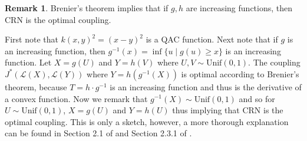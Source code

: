 \documentclass[12pt]{article}
\theoremstyle{plain}%
\theoremstyle{definition}
\newtheorem{remark}{Remark}[section]
\def\unif{\mathrm{Unif}}
\begin{document}
\begin{remark}\label{rem:brenier}
Brenier's theorem implies that if $g,h$ are increasing functions, then CRN is the optimal coupling. 

First note that $k(x,y)^2=(x-y)^2$ is a QAC function. Next note that if $g$ is an increasing function, then $g^{-1}(x)=\inf\{u\mid g(u)\geq x\}$ is an increasing function. Let $X=g(U)$ and $Y=h(V)$ where $U,V\sim \unif(0,1)$. The coupling $J^*(\mathcal{L}(X),\mathcal{L}(Y))$ where $Y=h(g^{-1}(X))$ is optimal according to Brenier's theorem, because $T=h\cdot g^{-1}$ is an increasing function and thus is the derivative of a convex function. Now we remark that $g^{-1}(X)\sim\unif(0,1)$ and so for $U\sim \unif(0,1)$, $X=g(U)$ and $Y=h(U)$ thus implying that CRN is the optimal coupling. This is only a sketch, however, a more thorough explanation can be found in Section 2.1 of \cite{santambrogio} and Section 2.3.1 of \cite{jacob}.
\end{remark}

%
%
%
\end{document}

